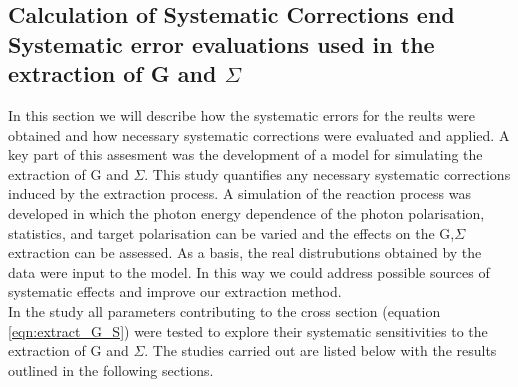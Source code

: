 \subsection{Calculation of Systematic Corrections end Systematic error evaluations used in  the extraction of G and \texorpdfstring{$\Sigma$}{Sigma}}
\label{ch:sys_corr}
In this section we will describe how the systematic errors for the reults were obtained and how necessary systematic corrections were evaluated and applied. A key part of this assesment was the development of a model for simulating the extraction of G and $\Sigma$. This study  quantifies any necessary systematic corrections induced by the extraction process. A simulation of the reaction process was developed in which the photon energy dependence of the photon polarisation, statistics, and target polarisation can be varied and the effects on the G,$\Sigma$ extraction can be assessed. As a basis, the real distrubutions obtained by the data were input to the model. In this way we could address possible sources of systematic effects and improve our extraction method. \\ 
In the study all parameters contributing to the cross section (equation \ref{eqn:extract_G_S}) were tested to explore their systematic sensitivities to the extraction of G and $\Sigma$. The studies carried out are listed below with the results outlined in the following sections.

